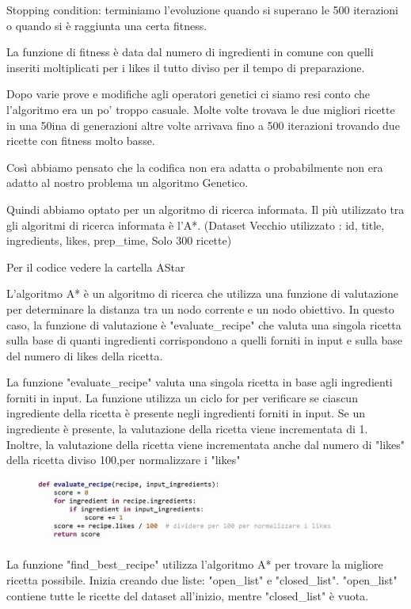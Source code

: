 \documentclass[12pt]{report}
\begin{document}
Stopping condition: terminiamo l’evoluzione quando si superano le 500 iterazioni o quando si è raggiunta una certa fitness.

La funzione di fitness è data dal numero di ingredienti in comune con quelli inseriti moltiplicati per i likes  il tutto diviso per il tempo di preparazione.

Dopo varie prove e modifiche agli operatori genetici ci siamo resi conto che l’algoritmo era un po' troppo casuale. Molte volte trovava le due migliori ricette in una 50ina di generazioni altre volte arrivava fino a 500 iterazioni trovando due ricette con fitness molto basse.

Così abbiamo pensato che la codifica non era adatta o probabilmente non era adatto al nostro problema un algoritmo Genetico.

Quindi abbiamo optato per un algoritmo di ricerca informata. Il più utilizzato tra gli algoritmi di ricerca informata è l’A*. (Dataset Vecchio utilizzato : id, title, ingredients, likes, prep\_time, Solo 300 ricette)

Per il codice vedere la cartella AStar

L'algoritmo A* è un algoritmo di ricerca che utilizza una funzione di valutazione per determinare la distanza tra un nodo corrente e un nodo obiettivo. In questo caso, la funzione di valutazione è "evaluate\_recipe" che valuta una singola ricetta sulla base di quanti ingredienti corrispondono a quelli forniti in input e sulla base del numero di likes della ricetta.

La funzione "evaluate\_recipe" valuta una singola ricetta in base agli ingredienti forniti in input. La funzione utilizza un ciclo for per verificare se ciascun ingrediente della ricetta è presente negli ingredienti forniti in input. Se un ingrediente è presente, la valutazione della ricetta viene incrementata di 1. Inoltre, la valutazione della ricetta viene incrementata anche dal numero di "likes" della ricetta diviso 100,per normalizzare i "likes"
\begin{figure}[H]
        \centering
        {\includegraphics[width=0.9\textwidth]{img/img10.jpg}}
\end{figure}

La funzione "find\_best\_recipe" utilizza l'algoritmo A* per trovare la migliore ricetta possibile. Inizia creando due liste: "open\_list" e "closed\_list". "open\_list" contiene tutte le ricette del dataset all'inizio, mentre "closed\_list" è vuota.
\end{document}
